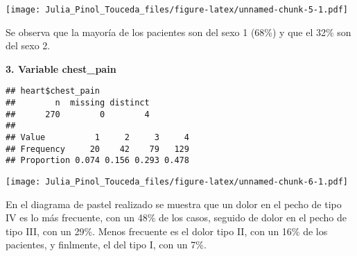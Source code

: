 \documentclass[]{article}
\newenvironment{Shaded}{\begin{snugshade}}{\end{snugshade}}
\newcommand{\KeywordTok}[1]{\textcolor[rgb]{0.13,0.29,0.53}{\textbf{#1}}}
\newcommand{\DataTypeTok}[1]{\textcolor[rgb]{0.13,0.29,0.53}{#1}}
\newcommand{\DecValTok}[1]{\textcolor[rgb]{0.00,0.00,0.81}{#1}}
\newcommand{\StringTok}[1]{\textcolor[rgb]{0.31,0.60,0.02}{#1}}
\newcommand{\OperatorTok}[1]{\textcolor[rgb]{0.81,0.36,0.00}{\textbf{#1}}}
\newcommand{\NormalTok}[1]{#1}
\begin{document}
\texttt{[image: Julia\_Pinol\_Touceda\_files/figure-latex/unnamed-chunk-5-1.pdf]}

Se observa que la mayoría de los pacientes son del sexo 1 (68\%) y que
el 32\% son del sexo 2.

\textbf{3. Variable chest\_pain}

\begin{Shaded}
\end{Shaded}

\begin{verbatim}
## heart$chest_pain 
##        n  missing distinct 
##      270        0        4 
##                                   
## Value          1     2     3     4
## Frequency     20    42    79   129
## Proportion 0.074 0.156 0.293 0.478
\end{verbatim}

\begin{Shaded}
\end{Shaded}

\texttt{[image: Julia\_Pinol\_Touceda\_files/figure-latex/unnamed-chunk-6-1.pdf]}

En el diagrama de pastel realizado se muestra que un dolor en el pecho
de tipo IV es lo más frecuente, con un 48\% de los casos, seguido de
dolor en el pecho de tipo III, con un 29\%. Menos frecuente es el dolor
tipo II, con un 16\% de los pacientes, y finlmente, el del tipo I, con
un 7\%.
\end{document}
